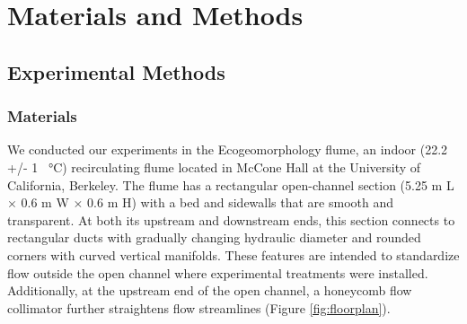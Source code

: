 \documentclass[geosciences,article,submit,moreauthors,pdftex]{Definitions/mdpi}
\begin{document}
\section{Materials and Methods}

\subsection{Experimental Methods}

\subsubsection{Materials}

We conducted our experiments in the Ecogeomorphology flume, an indoor (22.2 +/- 1 \SI{}{\celsius}) recirculating flume located in McCone Hall at the University of California, Berkeley. The flume has a rectangular open-channel section (5.25 m L $\times$ 0.6 m W $\times$ 0.6 m H) with a bed and sidewalls that are smooth and transparent. At both its upstream and downstream ends, this section connects to rectangular ducts with gradually changing hydraulic diameter and rounded corners with curved vertical manifolds. These features are intended to standardize flow outside the open channel where experimental treatments were installed. Additionally, at the upstream end of the open channel, a honeycomb flow collimator further straightens flow streamlines (Figure \ref{fig:floorplan}). 
\end{document}
